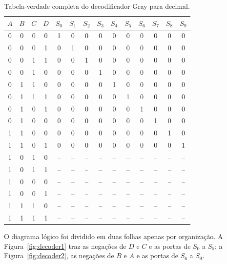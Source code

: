 \documentclass[12pt]{article}
\begin{document}
\begin{table}[H]
    \centering
    \small
    \caption{Tabela-verdade completa do decodificador Gray para decimal.}
    \label{tab:decoder}
    \begin{tabular}{|c|c|c|c||c|c|c|c|c|c|c|c|c|c|}
        \hline
        $A$ & $B$ & $C$ & $D$ & $S_0$ & $S_1$ & $S_2$ & $S_3$ & $S_4$ & $S_5$ & $S_6$ & $S_7$ & $S_8$ & $S_9$ \\
        \hline
        0 & 0 & 0 & 0 & 1 & 0 & 0 & 0 & 0 & 0 & 0 & 0 & 0 & 0 \\
        \hline
        0 & 0 & 0 & 1 & 0 & 1 & 0 & 0 & 0 & 0 & 0 & 0 & 0 & 0 \\
        \hline
        0 & 0 & 1 & 1 & 0 & 0 & 1 & 0 & 0 & 0 & 0 & 0 & 0 & 0 \\
        \hline
        0 & 0 & 1 & 0 & 0 & 0 & 0 & 1 & 0 & 0 & 0 & 0 & 0 & 0 \\
        \hline
        0 & 1 & 1 & 0 & 0 & 0 & 0 & 0 & 1 & 0 & 0 & 0 & 0 & 0 \\
        \hline
        0 & 1 & 1 & 1 & 0 & 0 & 0 & 0 & 0 & 1 & 0 & 0 & 0 & 0 \\
        \hline
        0 & 1 & 0 & 1 & 0 & 0 & 0 & 0 & 0 & 0 & 1 & 0 & 0 & 0 \\
        \hline
        0 & 1 & 0 & 0 & 0 & 0 & 0 & 0 & 0 & 0 & 0 & 1 & 0 & 0 \\
        \hline
        1 & 1 & 0 & 0 & 0 & 0 & 0 & 0 & 0 & 0 & 0 & 0 & 1 & 0 \\
        \hline
        1 & 1 & 0 & 1 & 0 & 0 & 0 & 0 & 0 & 0 & 0 & 0 & 0 & 1 \\
        \hline
        1 & 0 & 1 & 0 & -- & -- & -- & -- & -- & -- & -- & -- & -- & -- \\
        \hline
        1 & 0 & 1 & 1 & -- & -- & -- & -- & -- & -- & -- & -- & -- & -- \\
        \hline
        1 & 0 & 0 & 0 & -- & -- & -- & -- & -- & -- & -- & -- & -- & -- \\
        \hline
        1 & 0 & 0 & 1 & -- & -- & -- & -- & -- & -- & -- & -- & -- & -- \\
        \hline
        1 & 1 & 1 & 0 & -- & -- & -- & -- & -- & -- & -- & -- & -- & -- \\
        \hline
        1 & 1 & 1 & 1 & -- & -- & -- & -- & -- & -- & -- & -- & -- & -- \\
        \hline
    \end{tabular}
\end{table}

O diagrama lógico foi dividido em duas folhas apenas por organização. A Figura~\ref{fig:decoder1} traz as negações de $D$ e $C$ e as portas de $S_0$ a $S_5$; a Figura~\ref{fig:decoder2}, as negações de $B$ e $A$ e as portas de $S_6$ a $S_9$.
\end{document}
